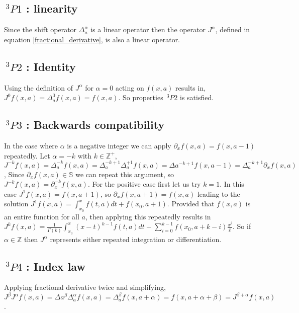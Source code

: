 \documentclass[%
 onecolumn,
 amsmath, amssymb, aps, pra, 10pt
]{revtex4-2}
\begin{document}
\subsection*{$\,^3P1$ : linearity}
Since the shift operator $\Delta_{a}^{\alpha}$ is a linear operator then the operator $J^{\alpha}$, defined in equation \eqref{fractional_derivative}, is also a linear operator.

\subsection*{$\,^3P2$ : Identity}
Using the definition of $J^{\alpha}$ for $\alpha=0$ acting on $f(x, a)$ results in, $J^{0}f(x, a) = \Delta_{a}^{0}f(x, a) = f(x, a)$. So properties $\,^3P2$ is satisfied.

\subsection*{$\,^3P3$ : Backwards compatibility}
In the case where $\alpha$ is a negative integer we can apply $\partial_x f(x, a) = f(x, a - 1)$ repeatedly. Let $\alpha = -k$ with $k \in \mathbb{Z}^+$, $J^{-k} f(x, a) = \Delta_{a}^{-k} f(x, a)=\Delta_{a}^{-k + 1}\Delta_{a}^{+1} f(x, a) = \Delta{a}^{-k + 1}f(x, a - 1) = \Delta_{a}^{-k + 1}\partial_x f(x, a)$, Since $\partial_x f(x, a) \in \mathbb{S}$ we can repeat this argument, so $J^{-k} f(x, a) = \partial_{x}^{-k} f(x, a)$. For the positive case first let us try $k=1$. In this case $J^{1} f(x, a) = f(x, a + 1)$, so $\partial_x f(x, a + 1) = f(x, a)$ leading to the solution $J^{1} f(x, a) = \int_{x_0}^{x} f(t, a)dt + f(x_0, a + 1)$. Provided that $f(x, a)$ is an entire function for all $a$, then applying this repeatedly results in $J^{k} f(x, a) = \frac{1}{\Gamma(k)}\int_{x_0}^{x} (x - t)^{k - 1}f(t, a)dt + \sum_{i = 0}^{k - 1}f(x_0, a + k - i)\frac{x^i}{i!}$. So if $\alpha \in \mathbb{Z}$ then $J^{\alpha}$ represents either repeated integration or differentiation.

\subsection*{$\,^3P4$ : Index law}
Applying fractional derivative twice and simplifying, $J^{\beta}J^{\alpha} f(x, a) = \Delta{a}^{\beta}\Delta_{a}^{\alpha} f(x, a) = \Delta_{a}^{\beta} f(x, a + \alpha) = f(x, a + \alpha + \beta) = J^{\beta + \alpha} f(x, a)$. \\
\end{document}
